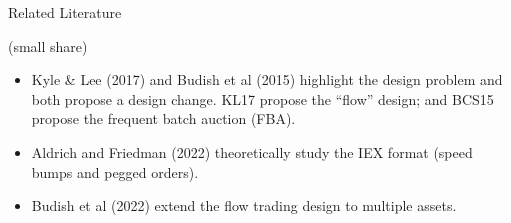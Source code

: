 \documentclass[10pt]{beamer}
\begin{document}
\begin{frame}{Related Literature}

(small share)

    \begin{itemize}
    

    \item Kyle \& Lee (2017) and Budish et al (2015) highlight the design problem and both propose a design change. KL17 propose the ``flow'' design; and BCS15 propose the frequent batch auction (FBA). %

    \item Aldrich and Friedman (2022) theoretically study the IEX format (speed bumps and pegged orders). %

    \item Budish et al (2022) extend the flow trading design to multiple assets. %
    




\end{itemize}
\end{frame}
\end{document}
